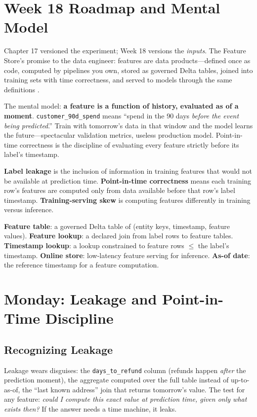 \section{Week 18 Roadmap and Mental Model}
Chapter 17 versioned the experiment; Week 18 versions the \emph{inputs}. The Feature Store's promise to the data engineer: features are data products---defined once as code, computed by pipelines you own, stored as governed Delta tables, joined into training sets with time correctness, and served to models through the same definitions \cite{databricksFeatureStore}.

The mental model: \textbf{a feature is a function of history, evaluated as of a moment}. \texttt{customer\_90d\_spend} means ``spend in the 90 days \emph{before the event being predicted}.'' Train with tomorrow's data in that window and the model learns the future---spectacular validation metrics, useless production model. Point-in-time correctness is the discipline of evaluating every feature strictly before its label's timestamp.

\begin{definitionbox}
\textbf{Label leakage} is the inclusion of information in training features that would not be available at prediction time. \textbf{Point-in-time correctness} means each training row's features are computed only from data available before that row's label timestamp. \textbf{Training-serving skew} is computing features differently in training versus inference.
\end{definitionbox}

\begin{keyterms}
\textbf{Feature table}: a governed Delta table of (entity keys, timestamp, feature values). \textbf{Feature lookup}: a declared join from label rows to feature tables. \textbf{Timestamp lookup}: a lookup constrained to feature rows $\le$ the label's timestamp. \textbf{Online store}: low-latency feature serving for inference. \textbf{As-of date}: the reference timestamp for a feature computation.
\end{keyterms}

\section{Monday: Leakage and Point-in-Time Discipline}
\subsection{Recognizing Leakage}
Leakage wears disguises: the \texttt{days\_to\_refund} column (refunds happen \emph{after} the prediction moment), the aggregate computed over the full table instead of up-to-as-of, the ``last known address'' join that returns tomorrow's value. The test for any feature: \emph{could I compute this exact value at prediction time, given only what exists then?} If the answer needs a time machine, it leaks.

